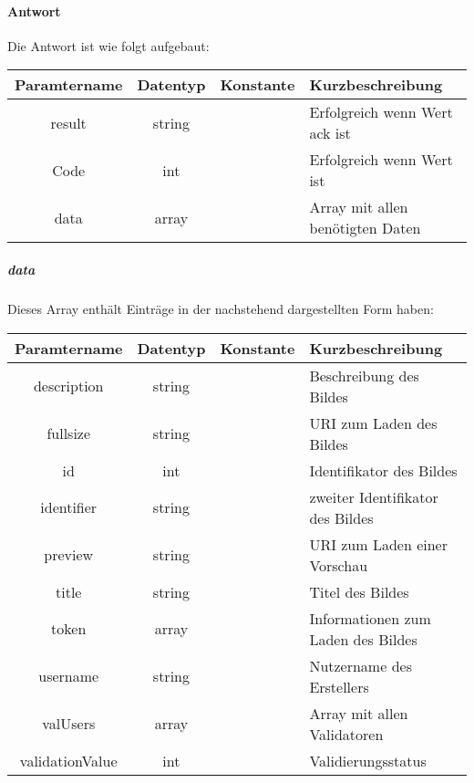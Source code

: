 \paragraph{Antwort}Die Antwort ist wie folgt aufgebaut:
\begin{table}[H]
	\begin{tabular}{|c|c|c|p{6.5cm}|}
		\hline
		\textbf{Paramtername} & \textbf{Datentyp} & \textbf{Konstante} & \textbf{Kurzbeschreibung}                                                                                               \\ \hline
		result              & string           &                 & Erfolgreich wenn Wert {\glqq ack\grqq} ist \\ \hline
		Code                & int              &                 & Erfolgreich wenn Wert {\glqq 0\grqq} ist \\ \hline
		data                & array            &                 & Array mit allen benötigten Daten \\ \hline
	\end{tabular}
\end{table}
\subparagraph{data}Dieses Array enthält Einträge in der nachstehend dargestellten Form haben:
\begin{table}[H]
	\begin{tabular}{|c|c|c|p{6.5cm}|}
		\hline
		\textbf{Paramtername} & \textbf{Datentyp} & \textbf{Konstante} & \textbf{Kurzbeschreibung}    \\ \hline
		description            & string          &                 & Beschreibung des Bildes \\ \hline
		fullsize               & string          &                 & URI zum Laden des Bildes \\ \hline
		id                     & int             &                 & Identifikator des Bildes \\ \hline
		identifier             & string          &                 & zweiter Identifikator des Bildes \\ \hline
		preview                & string          &                 & URI zum Laden einer Vorschau \\ \hline
		title                  & string          &                 & Titel des Bildes \\ \hline
		token                  & array           &                 & Informationen zum Laden des Bildes \\ \hline
		username               & string          &                 & Nutzername des Erstellers \\ \hline
		valUsers               & array           &                 & Array mit allen Validatoren \\ \hline
		validationValue        & int             &                 & Validierungsstatus \\ \hline
	\end{tabular}
\end{table}
